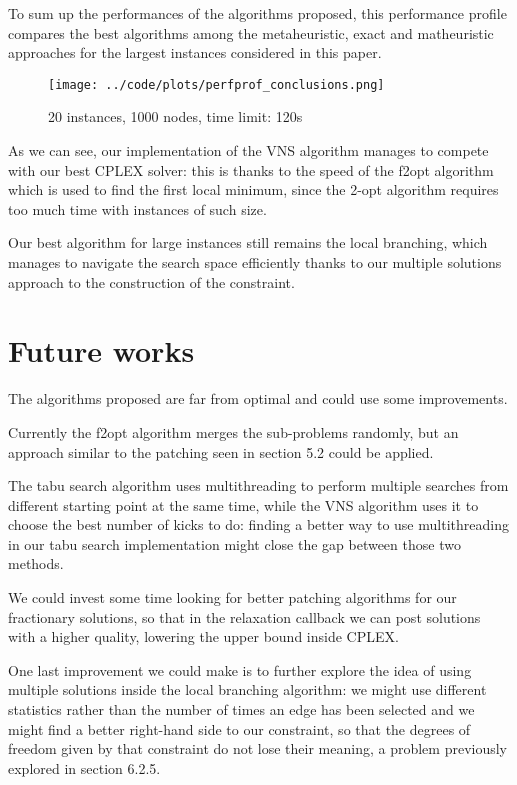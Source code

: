 To sum up the performances of the algorithms proposed, this performance profile compares the best algorithms among the metaheuristic, exact and matheuristic approaches for the largest instances considered in this paper.

\begin{figure}[h]
    \centering
    \texttt{[image: ../code/plots/perfprof\_conclusions.png]}
    \caption*{20 instances, 1000 nodes, time limit: 120s}
\end{figure}

As we can see, our implementation of the VNS algorithm manages to compete with our best CPLEX solver: this is thanks to the speed of the f2opt algorithm which is used to find the first local minimum, since the 2-opt algorithm requires too much time with instances of such size.

Our best algorithm for large instances still remains the local branching, which manages to navigate the search space efficiently thanks to our multiple solutions approach to the construction of the constraint.

\newpage

\section{Future works}
The algorithms proposed are far from optimal and could use some improvements.

Currently the f2opt algorithm merges the sub-problems randomly, but an approach similar to the patching seen in section 5.2 could be applied.

The tabu search algorithm uses multithreading to perform multiple searches from different starting point at the same time, while the VNS algorithm uses it to choose the best number of kicks to do: finding a better way to use multithreading in our tabu search implementation might close the gap between those two methods.

We could invest some time looking for better patching algorithms for our fractionary solutions, so that in the relaxation callback we can post solutions with a higher quality, lowering the upper bound inside CPLEX.

One last improvement we could make is to further explore the idea of using multiple solutions inside the local branching algorithm: we might use different statistics rather than the number of times an edge has been selected and we might find a better right-hand side to our constraint, so that the degrees of freedom given by that constraint do not lose their meaning, a problem previously explored in section 6.2.5.